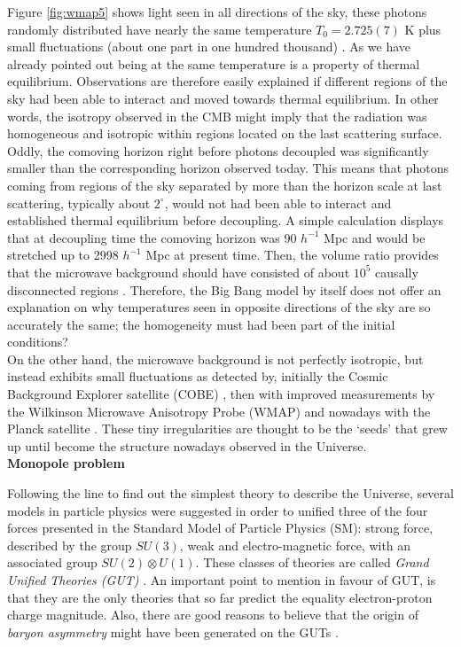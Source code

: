 \documentclass{rmaa}
\begin{document}
Figure \ref{fig:wmap5} shows light seen in all directions of the sky, 
these photons randomly distributed have nearly the same temperature $T_0= 2.725(7)$ K
plus small fluctuations (about one part in one hundred thousand) \citep{Apar,Planckck}.
 As we have already pointed out being at the same 
temperature is a property of thermal equilibrium. Observations are therefore easily explained 
if different regions of the sky had been able to interact and moved towards thermal 
equilibrium. In other words, the isotropy observed in the CMB might imply that the radiation was 
homogeneous and isotropic within regions located on the last scattering surface.
Oddly, the comoving horizon right before  
photons decoupled was significantly smaller than the corresponding horizon observed today.
This means that photons coming from regions of the sky separated by more than the
horizon scale at last scattering, typically about $2^\circ$, would not 
had been  able to interact and established thermal equilibrium before decoupling. 
A simple calculation displays that at decoupling time the comoving horizon was
90 $h^{-1}$ Mpc and would be stretched up to 2998 $h^{-1}$ Mpc  at present time.
Then, the volume ratio provides that the microwave background should have consisted of 
about $10^5$ causally disconnected regions \citep{McCoy}.  
Therefore, the Big Bang model by itself does not offer an explanation on why
temperatures seen in opposite directions of the sky are so accurately the same; the homogeneity
must had been part of the initial conditions? 
\\

On the other hand, the microwave background is not perfectly isotropic, but instead exhibits
small fluctuations as detected by, initially the Cosmic Background Explorer satellite (COBE) \citep{Smooth}, 
 then with improved measurements by the Wilkinson Microwave Anisotropy Probe (WMAP)
\citep{wmap5, Larson} and nowadays with the Planck satellite \citep{Planck}. 
These tiny irregularities are thought to be the `seeds' that grew 
up until become the structure nowadays observed in the Universe. 
\\


\vskip 16pt
\textbf{Monopole problem} 
\vskip 10pt

Following the line to find out the simplest theory to describe the Universe,
several models in particle physics were suggested in order to unified three of the 
four forces presented in the Standard Model of Particle Physics (SM): strong force, described
by the group $SU(3)$, weak and electro-magnetic force, with an associated group $SU(2)\otimes U(1)$. 
These classes of theories are called \textit{Grand Unified Theories (GUT)} \citep{Georgi}.
 An important point to mention in favour of GUT,  is that they are the only theories that so far
 predict the equality electron-proton charge magnitude. Also, there are good reasons to 
 believe that the origin of \textit{baryon asymmetry} might have been generated on the GUTs \citep{Kolb83}.
\\
\end{document}
